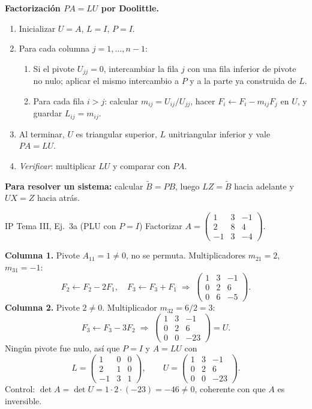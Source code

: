 \begin{receta}
\textbf{Factorización $PA = LU$ por Doolittle.}
\begin{enumerate}
\item Inicializar $U = A$, $L = I$, $P = I$.
\item Para cada columna $j = 1, \dots, n-1$:
  \begin{enumerate}
  \item Si el pivote $U_{jj} = 0$, intercambiar la fila $j$ con una fila inferior de pivote no nulo; aplicar el mismo intercambio a $P$ y a la parte ya construida de $L$.
  \item Para cada fila $i > j$: calcular $m_{ij} = U_{ij}/U_{jj}$, hacer $F_i \leftarrow F_i - m_{ij} F_j$ en $U$, y guardar $L_{ij} = m_{ij}$.
  \end{enumerate}
\item Al terminar, $U$ es triangular superior, $L$ unitriangular inferior y vale $PA = LU$.
\item \emph{Verificar}: multiplicar $LU$ y comparar con $PA$.
\end{enumerate}

\textbf{Para resolver un sistema:} calcular $\tilde B = PB$, luego $LZ = \tilde B$ hacia adelante y $UX = Z$ hacia atrás.
\end{receta}

\begin{ejemplo}{IP Tema III, Ej.\ 3a (PLU con $P=I$)}
Factorizar $A = \begin{pmatrix} 1 & 3 & -1 \\ 2 & 8 & 4 \\ -1 & 3 & -4 \end{pmatrix}$.

\textbf{Columna 1.} Pivote $A_{11} = 1 \neq 0$, no se permuta. Multiplicadores $m_{21} = 2$, $m_{31} = -1$:
\[
F_2 \leftarrow F_2 - 2F_1, \quad F_3 \leftarrow F_3 + F_1 \;\Rightarrow\; \begin{pmatrix} 1 & 3 & -1 \\ 0 & 2 & 6 \\ 0 & 6 & -5 \end{pmatrix}.
\]
\textbf{Columna 2.} Pivote $2 \neq 0$. Multiplicador $m_{32} = 6/2 = 3$:
\[
F_3 \leftarrow F_3 - 3F_2 \;\Rightarrow\; \begin{pmatrix} 1 & 3 & -1 \\ 0 & 2 & 6 \\ 0 & 0 & -23 \end{pmatrix} = U.
\]
Ningún pivote fue nulo, así que $P = I$ y $A = LU$ con
\[
L = \begin{pmatrix} 1 & 0 & 0 \\ 2 & 1 & 0 \\ -1 & 3 & 1 \end{pmatrix}, \qquad U = \begin{pmatrix} 1 & 3 & -1 \\ 0 & 2 & 6 \\ 0 & 0 & -23 \end{pmatrix}.
\]
Control: $\det A = \det U = 1 \cdot 2 \cdot (-23) = -46 \neq 0$, coherente con que $A$ es inversible.
\end{ejemplo}

